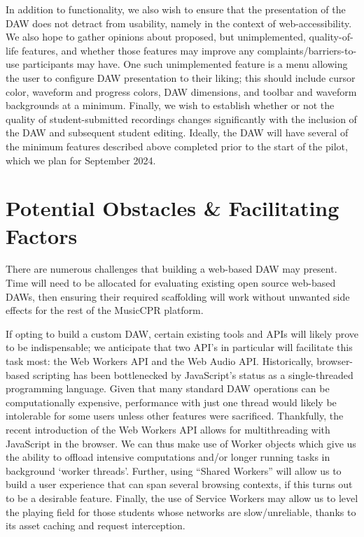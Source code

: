 \documentclass[manuscript,screen,review]{acmart}
\begin{document}
In addition to functionality, we also wish to ensure that the presentation of the DAW does not detract from usability, namely in the context of web-accessibility.
We also hope to gather opinions about proposed, but unimplemented, quality-of-life features, and whether those features may improve any complaints/barriers-to-use participants may have.
One such unimplemented feature is a menu allowing the user to configure DAW presentation to their liking; this should include cursor color, waveform and progress colors, DAW dimensions, and toolbar and waveform backgrounds at a minimum.
Finally, we wish to establish whether or not the quality of student-submitted recordings changes significantly with the inclusion of the DAW and subsequent student editing.
Ideally, the DAW will have several of the minimum features described above completed prior to the start of the pilot, which we plan for September 2024.


\section{Potential Obstacles \& Facilitating Factors}
There are numerous challenges that building a web-based DAW may present.
Time will need to be allocated for evaluating existing open source web-based DAWs, then ensuring their required scaffolding will work without unwanted side effects for the rest of the MusicCPR platform.

If opting to build a custom DAW, certain existing tools and APIs will likely prove to be indispensable;
we anticipate that two API's in particular will facilitate this task most: the Web Workers API and the Web Audio API.
Historically, browser-based scripting has been bottlenecked by JavaScript's status as a single-threaded programming language.
Given that many standard DAW operations can be computationally expensive, performance with just one thread would likely be intolerable for some users unless other features were sacrificed.
Thankfully, the recent introduction of the Web Workers API allows for multithreading with JavaScript in the browser.
We can thus make use of Worker objects which give us the ability to offload intensive computations and/or longer running tasks in background `worker threads'.
Further, using ``Shared Workers'' will allow us to build a user experience that can span several browsing contexts, if this turns out to be a desirable feature.
Finally, the use of Service Workers may allow us to level the playing field for those students whose networks are slow/unreliable, thanks to its asset caching and request interception.
\end{document}

